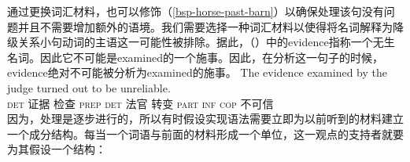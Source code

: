 \noindent
通过更换词汇材料，也可以修饰（\ref{bsp-horse-past-barn}）以确保处理该句没有问题并且不需要增加额外的语境。我们需要选择一种词汇材料以使得将名词解释为降级关系小句动词的主语这一可能性被排除。据此，（）中的evidence指称一个无生名词。因此它不可能是examined的一个施事。因此，在分析这一句子的时候，evidence绝对不可能被分析为examined的施事\citep{SW2011a}。
\ea
\gll The evidence examined by the judge turned out to be unreliable.\\
    \textsc{det} 证据 检查 \textsc{prep} \textsc{det} 法官 转变 \textsc{part} \textsc{inf} \textsc{cop}  不可信\\
\z
因为，处理是逐步进行的，所以有时假设实现语法需要立即为以前听到的材料建立一个成分结构\citep{AS82a,Hausser92a-u}。每当一个词语与前面的材料形成一个单位，这一观点的支持者就要为其假设一个结构：

